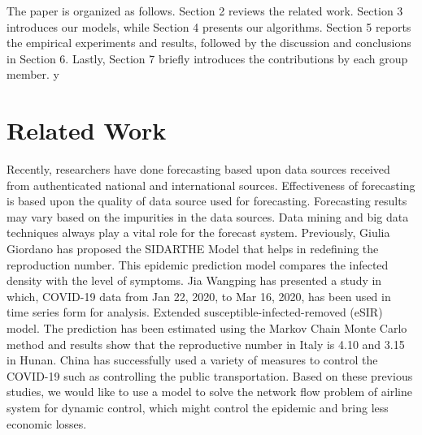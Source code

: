 The paper is organized as follows. Section 2 reviews the related work. Section 3 introduces our models, while Section 4 presents our algorithms. Section 5 reports the empirical experiments and results, followed by the discussion and conclusions in Section 6. Lastly, Section 7 briefly introduces the contributions by each group member. 
y


\section{Related Work}
Recently, researchers have done forecasting based upon data sources received from authenticated national and international sources. Effectiveness of forecasting is based upon the quality of data source used for forecasting. Forecasting results may vary based on the impurities in the data sources. Data mining and big data techniques always play a vital role for the forecast system\cite{huang2018air}. Previously, Giulia Giordano\cite{giordano2020sidarthe} has proposed the SIDARTHE Model that helps in redefining the reproduction number. This epidemic prediction model compares the infected density with the level of symptoms. Jia Wangping\cite{wangping2020extended} has presented a study in which, COVID-19 data from Jan 22, 2020, to Mar 16, 2020, has been used in time series form for analysis. Extended susceptible-infected-removed (eSIR) model. The prediction has been estimated using the Markov Chain Monte Carlo method and results show that the reproductive number in Italy is 4.10 and 3.15 in Hunan. China has successfully used a variety of measures to control the COVID-19 such as controlling the public transportation\cite{shen2020prevention,kucharski2020early}. Based on these previous studies, we would like to use a model to solve the network flow problem of airline system for dynamic control, which might control the epidemic and bring less economic losses. 
